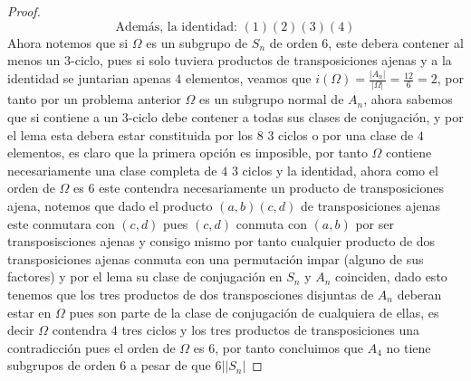 \documentclass[11pt,letterpaper]{article}
\begin{document}
\begin{proof}
\[
\text{Además, la identidad: } (1)(2)(3)(4)
\]
Ahora notemos que si $\Omega$ es un subgrupo de $S_n$ de orden $6$, este debera contener al menos un $3$-ciclo, pues si solo tuviera productos de transposiciones ajenas y a la identidad se juntarian apenas $4$ elementos, veamos que $i(\Omega)=\frac{|A_n|}{|\Omega|}=\frac{12}{6}=2$, por tanto por un problema anterior
$\Omega$ es un subgrupo normal de $A_n$, ahora sabemos que si contiene a un $3$-ciclo debe contener a todas sus clases de conjugaci\'on, y por el lema esta debera estar constituida por los $8$ $3$ ciclos o por una clase de $4$ elementos, es claro que la primera opci\'on es imposible, por tanto $\Omega$ contiene necesariamente una clase completa de $4$ $3$ ciclos y la identidad, ahora 
como el orden de $\Omega$ es $6$ este contendra necesariamente un producto de transposiciones ajena, notemos que dado el producto $(a,b)(c,d)$ de transposiciones ajenas este conmutara con $(c,d)$ pues $(c,d)$ conmuta con $(a,b)$ por ser transposisciones ajenas y consigo mismo por tanto cualquier producto de dos transposiciones ajenas conmuta con una permutaci\'on impar (alguno de sus factores) y por el lema su clase de conjugaci\'on en $S_n$ y $A_n$ coinciden, dado esto
tenemos que los tres productos de dos transposciones disjuntas de $A_n$ deberan estar en $\Omega$ pues son parte de la clase de conjugaci\'on de cualquiera de ellas, es decir $\Omega$ contendra $4$ tres ciclos y los tres productos de transposiciones una contradicción pues el orden de $\Omega$ es $6$, por tanto concluimos que $A_4$ no tiene subgrupos de orden $6$ a pesar de que $6||S_n|$
\end{proof}
\end{document}
